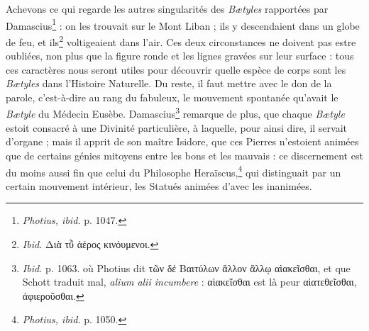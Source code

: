 \documentclass[a4paper, 11pt, oneside, polutonikogreek, french, landscape]{article}
\begin{document}
Achevons ce qui regarde les autres singularités des \emph{Bætyles} rapportées par Damascius\footnote{\emph{Photius, ibid.} p. 1047.} : on les trouvait sur le Mont Liban ; ils y descendaient dans un globe de feu, et ils\footnote{\emph{Ibid.} Διὰ τῧ ἀέρος κινόυμενοι.} voltigeaient dans l'air. Ces deux circonstances ne doivent pas estre oubliées, non plus que la figure ronde et les lignes gravées sur leur surface : tous ces caractères nous seront utiles pour découvrir quelle espèce de corps sont les \emph{Bætyles} dans l'Histoire Naturelle. Du reste, il faut mettre avec le don de la parole, c'est-à-dire au rang du fabuleux, le mouvement spontanée qu'avait le \emph{Bætyle} du Médecin Eusèbe. Damascius\footnote{\emph{Ibid.} p. 1063. où Photius dit τῶν δἐ Βαιτύλων ἂλλον ἂλλῳ αὶακεῖσθαι, et que Schott traduit mal, \emph{alium alii incumbere} : αὶακεῖσθαι est là peur αὶατεθεῖσθαι, ἀφιεροῦσθαι.} remarque de plus, que chaque \emph{Bætyle} estoit consacré à une Divinité particulière, à laquelle, pour ainsi dire, il servait d'organe ; mais il apprit de son maître Isidore, que ces Pierres n'estoient animées que de certains génies mitoyens entre les bons et les mauvais : ce discernement est du moins aussi fin que celui du Philosophe Heraïscus,\footnote{\emph{Photius, ibid.} p. 1050.} qui distinguait par un certain mouvement intérieur, les Statués animées d'avec les inanimées.
\end{document}

